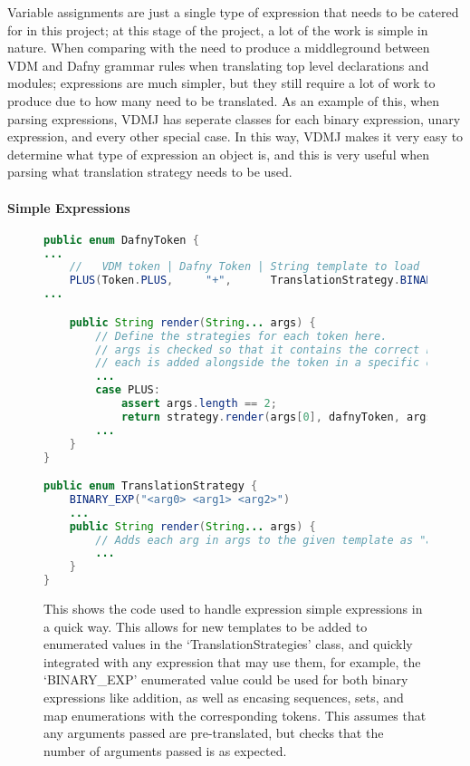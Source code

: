 \documentclass{entcs}
\begin{document}
Variable assignments are just a single type of expression that needs to be catered for in this project; at this stage of the project, a lot of the work is simple in nature. When comparing with the need to produce a middleground between VDM and Dafny grammar rules when translating top level declarations and modules; expressions are much simpler, but they still require a lot of work to produce due to how many need to be translated. As an example of this, when parsing expressions, VDMJ has seperate classes for each binary expression, unary expression, and every other special case. In this way, VDMJ makes it very easy to determine what type of expression an object is, and this is very useful when parsing what translation strategy needs to be used.

\paragraph{Simple Expressions}

\begin{figure}[h]
	\begin{center}
        \begin{lstlisting}[language=Java]
public enum DafnyToken {
...
    //   VDM token | Dafny Token | String template to load
    PLUS(Token.PLUS,     "+",      TranslationStrategy.BINARY_EXP)
...

    public String render(String... args) {
        // Define the strategies for each token here. 
        // args is checked so that it contains the correct number of args.
        // each is added alongside the token in a specific order, e.g.
        ...
        case PLUS: 
            assert args.length == 2;
            return strategy.render(args[0], dafnyToken, args[1]);
        ...
    }
}

public enum TranslationStrategy {
    BINARY_EXP("<arg0> <arg1> <arg2>")
    ...
    public String render(String... args) {
        // Adds each arg in args to the given template as "argN" where N is it's position in the 'args' array
        ...
    }
}
        \end{lstlisting}
		\caption{This shows the code used to handle expression simple expressions in a quick way. This allows for new templates to be added to enumerated values in the `TranslationStrategies' class, and quickly integrated with any expression that may use them, for example, the `BINARY\_EXP' enumerated value could be used for both binary expressions like addition, as well as encasing sequences, sets, and map enumerations with the corresponding tokens. This assumes that any arguments passed are pre-translated, but checks that the number of arguments passed is as expected.}\label{fig:binary_expressions}
	\end{center}
\end{figure}
\end{document}
